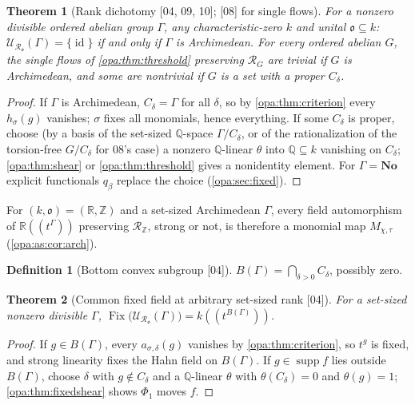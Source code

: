 \documentclass[11pt,oneside]{article}
\numberwithin{equation}{section}
\newtheorem{theorem}{Theorem}[section]
\theoremstyle{definition}
\newtheorem{definition}[definition]{Definition}
\theoremstyle{remark}
\newcommand{\No}{\mathbf{No}}
\newcommand{\R}{\mathbb R}
\newcommand{\Q}{\mathbb Q}
\newcommand{\Z}{\mathbb Z}
\newcommand{\oo}{\mathfrak o}
\newcommand{\Ro}{\mathcal R_{\oo}}
\newcommand{\UU}{\mathcal U}
\newcommand{\supp}{\operatorname{supp}}
\newcommand{\id}{\operatorname{id}}
\newcommand{\Fix}{\operatorname{Fix}}
\newcommand{\Hahn}[2]{#1((t^{#2}))}
\newcommand{\src}[1]{\textup{\textsf{\small[#1]}}}
\begin{document}
\begin{theorem}[Rank dichotomy \src{04, 09, 10}; \src{08} for single flows]\label{opa:thm:rank}
For a nonzero divisible ordered abelian group $\Gamma$, any characteristic-zero
$k$ and unital $\oo\subseteq k$: $\UU_{\Ro}(\Gamma)=\{\id\}$ if and only if $\Gamma$
is Archimedean. For every ordered abelian $G$, the single flows of
\cref{opa:thm:threshold} preserving $\mathcal R_G$ are trivial if $G$ is
Archimedean, and some are nontrivial if $G$ is a set with a proper $C_\delta$.
\end{theorem}
\begin{proof}
If $\Gamma$ is Archimedean, $C_\delta=\Gamma$ for all $\delta$, so by
\cref{opa:thm:criterion} every $h_\sigma(g)$ vanishes; $\sigma$ fixes all
monomials, hence everything. If some $C_\delta$ is proper, choose (by a basis
of the set-sized $\Q$-space $\Gamma/C_\delta$, or of the rationalization of the
torsion-free $G/C_\delta$ for 08's case) a nonzero $\Q$-linear $\theta$ into
$\Q\subseteq k$ vanishing on $C_\delta$; \cref{opa:thm:shear} or
\cref{opa:thm:threshold} gives a nonidentity element. For $\Gamma=\No$ explicit
functionals $q_\beta$ replace the choice (\cref{opa:sec:fixed}).
\end{proof}

For $(k,\oo)=(\R,\Z)$ and a set-sized Archimedean $\Gamma$, every field
automorphism of $\Hahn\R\Gamma$ preserving $\mathcal R_\Z$, strong or not, is
therefore a monomial map $M_{\chi,\tau}$ (\cref{opa:as:cor:arch}).

\begin{definition}[Bottom convex subgroup \src{04}]\label{opa:def:bottom}
$B(\Gamma)=\bigcap_{\delta>0}C_\delta$, possibly zero.
\end{definition}

\begin{theorem}[Common fixed field at arbitrary set-sized rank \src{04}]\label{opa:thm:bottom}
For a set-sized nonzero divisible $\Gamma$, $\Fix\bigl(\UU_{\Ro}(\Gamma)\bigr)=
\Hahn k{B(\Gamma)}$.
\end{theorem}
\begin{proof}
If $g\in B(\Gamma)$, every $a_{\sigma,\delta}(g)$ vanishes by
\cref{opa:thm:criterion}, so $t^g$ is fixed, and strong linearity fixes the Hahn
field on $B(\Gamma)$. If $g\in\supp f$ lies outside $B(\Gamma)$, choose $\delta$
with $g\notin C_\delta$ and a $\Q$-linear $\theta$ with $\theta(C_\delta)=0$ and
$\theta(g)=1$; \cref{opa:thm:fixedshear} shows $\Phi_1$ moves $f$.
\end{proof}
\end{document}
